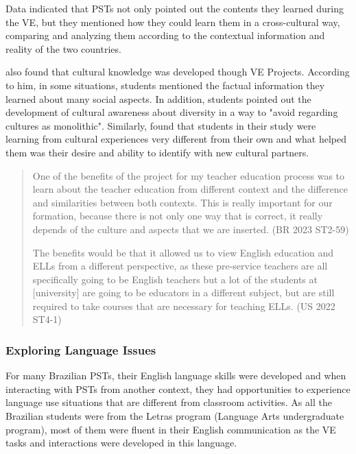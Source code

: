 Data indicated that PSTs not only pointed out the contents they learned
during the VE, but they mentioned how they could learn them in a
cross-cultural way, comparing and analyzing them according to the
contextual information and reality of the two countries.

\textcite{odowd2021virtual} also found that cultural knowledge was
developed though VE Projects. According to him, in some situations,
students mentioned the factual information they learned about many
social aspects. In addition, students pointed out the development of
cultural awareness about diversity in a way to "avoid regarding cultures
as monolithic". Similarly, \textcite{kopish2020leveraging} found that students
in their study were learning from cultural experiences very different
from their own and what helped them was their desire and ability to
identify with new cultural partners.

\begin{quote}
One of the benefits of the project for my teacher education
process was to learn about the teacher education from different context
and the difference and similarities between both contexts. This is
really important for our formation, because there is not only one way
that is correct, it really depends of the culture and aspects that we
are inserted. (BR 2023 ST2-59)

The benefits would be that it allowed us to view English education
and ELLs from a different perspective, as these pre-service teachers are
all specifically going to be English teachers but a lot of the students
at [university] are going to be educators in a different subject,
but are still required to take courses that are necessary for teaching
ELLs. (US 2022 ST4-1)
\end{quote}
	
\subsubsection{Exploring Language Issues}\label{sub-sub-sec-exploring}

For many Brazilian PSTs, their English language skills were developed
and when interacting with PSTs from another context, they had
opportunities to experience language use situations that are different
from classroom activities. As all the Brazilian students were from the
Letras program (Language Arts undergraduate program), most of them were
fluent in their English communication as the VE tasks and interactions
were developed in this language.

